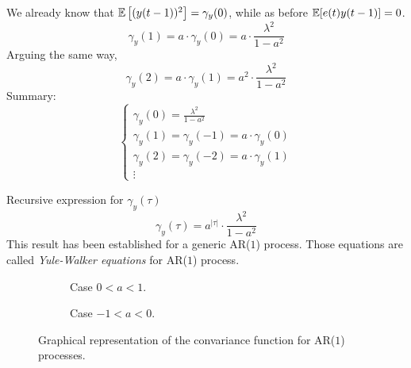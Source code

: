 We already know that $\mathbb{E}\left[(y(t-1))^{2}\right]=\gamma_{y}(0)$, while as before $\mathbb{E}[e(t) y(t-1)]=0$.
$$
\gamma_{y}(1)=a \cdot \gamma_{y}(0)=a \cdot \frac{\lambda^{2}}{1-a^{2}}
$$
Arguing the same way,
\[
	\gamma_{y}(2)=a \cdot \gamma_{y}(1)=a^{2} \cdot \frac{\lambda^{2}}{1-a^{2}}
\]
Summary:
\begin{equation*}
	\boxed{
		\begin{cases}
			\gamma_{y}(0)=\frac{\lambda^{2}}{1-a^{2}} \\
			\gamma_{y}(1)=\gamma_{y}(-1)=a \cdot \gamma_{y}(0) \\
			\gamma_{y}(2)=\gamma_{y}(-2)=a \cdot \gamma_{y}(1) \\
			\vdots
		\end{cases}
	}
\end{equation*}

Recursive expression for $\gamma_{y}(\tau)$
$$
	\gamma_{y}(\tau)=a^{|\tau|}\cdot \frac{\lambda^{2}}{1-a^{2}}
$$
This result has been established for a generic AR($1$) process.
Those equations are called \emph{Yule-Walker equations} for AR($1$) process.

\begin{figure}[htpb]
	\centering
	\begin{subfigure}{.5\textwidth}
		\centering
		\caption{Case $0<a<1$.}
	\end{subfigure}%
	\begin{subfigure}{.5\textwidth}
		\centering
		\caption{Case $-1<a<0$.}
	\end{subfigure}
	\caption{Graphical representation of the convariance function for AR($1$) processes.}
\end{figure}
\FloatBarrier

